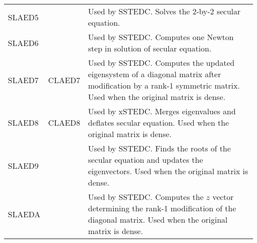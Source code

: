 \begin{center}
\begin{tabular}{| l  p{0.75in} | p{4.5in}    |}
SLAED5& &
Used by SSTEDC.
Solves the 2-by-2 secular equation. \\
SLAED6& &
Used by SSTEDC.
Computes one Newton step in solution of secular equation. \\
SLAED7&CLAED7&
Used by SSTEDC.
Computes the updated eigensystem of a diagonal
matrix after modification by a rank-1 symmetric matrix.
Used when the original matrix is dense.  \\
SLAED8&CLAED8&
Used by xSTEDC.
Merges eigenvalues and deflates secular equation.
Used when the original matrix is dense.  \\
SLAED9& &
Used by SSTEDC.
Finds the roots of the secular equation and updates the eigenvectors.
Used when the original matrix is dense. \\
SLAEDA& &
Used by SSTEDC.
Computes the $z$ vector determining the rank-1 modification of the
diagonal matrix.
Used when the original matrix is dense. \\
\hline
\end{tabular}
\end{center}
